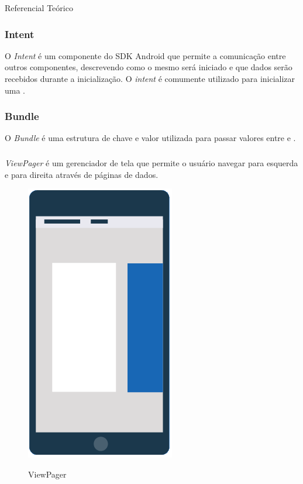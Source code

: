 \documentclass[
	12pt,				%
	openany,			%
	twoside,			%
	a4paper,			%
	english,			%
	french,				%
	spanish,			%
	brazil				%
	]{abntex2}
\begin{document}
\begin{chapter}{Referencial Teórico}
\subsubsection{Intent} \label{Intent}
O \textit{Intent} é um componente do SDK Android que permite a comunicação entre outros componentes, descrevendo como o mesmo será iniciado e que dados serão recebidos durante a inicialização. O \textit{intent} é comumente utilizado para inicializar uma .

\subsubsection{Bundle} \label{Bundle}
O \textit{Bundle} é uma estrutura de chave e valor utilizada para passar valores entre  e .


\newpage
\subsubsection{} \label{ViewPager}
\textit{ViewPager} é um gerenciador de tela que permite o usuário navegar para esquerda e para direita através de páginas de dados.
\begin{figure}[h]
\centering
   \caption{ViewPager}
   \includegraphics[scale=0.8]{media/viewpager.jpg}
     \label{fig:viewpager}
\end{figure}


\end{chapter}
\end{document}
